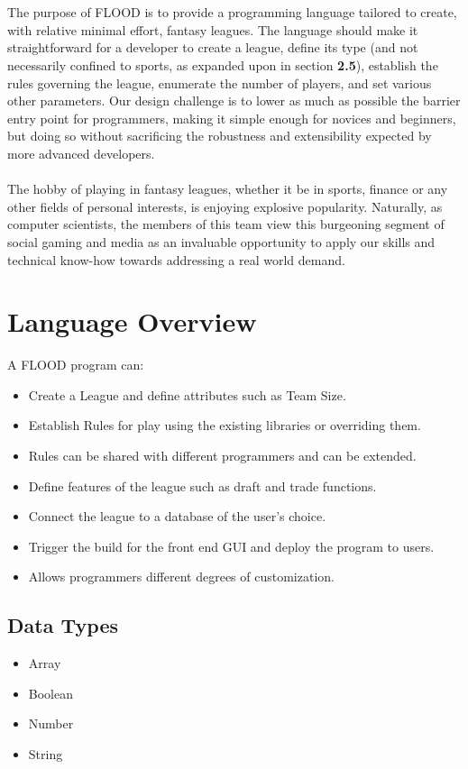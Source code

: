 \documentclass[12pt]{article}
\begin{document}
\\\\
The purpose of FLOOD is to provide a programming language tailored to create, with relative minimal effort, fantasy leagues. The language should make it straightforward for a developer to create a league, define its type (and not necessarily confined to sports, as expanded upon in section \textbf{2.5}), establish the rules governing the league, enumerate the number of players, and set various other parameters. Our design challenge is to lower as much as possible the barrier entry point for programmers, making it simple enough for novices and beginners, but doing so without sacrificing the robustness and extensibility expected by more advanced developers.
\\\\
The hobby of playing in fantasy leagues, whether it be in sports, finance or any other fields of personal interests, is enjoying explosive popularity. Naturally, as computer scientists, the members of this team view this burgeoning segment of social gaming and media as an invaluable opportunity to apply our skills and technical know-how towards addressing a real world demand.

\section{Language Overview}
A FLOOD program can:
\begin{itemize}
\setlength{\itemsep}{1pt}
\item Create a League and define attributes such as Team Size.
\item Establish Rules for play using the existing libraries or overriding them.
\item Rules can be shared with different programmers and can be extended.
\item Define features of the league such as draft and trade functions.
\item Connect the league to a database of the user's choice.
\item Trigger the build for the front end GUI and deploy the program to users.
\item Allows programmers different degrees of customization.
\end{itemize}

\subsection{Data Types}
\begin{itemize}
\setlength{\itemsep}{1pt}
\item Array
\item Boolean
\item Number
\item String
\end{itemize}
\end{document}
